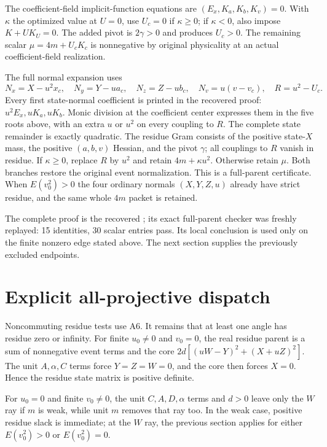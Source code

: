 The coefficient-field implicit-function equations are
$(E_x,K_a,K_b,K_v)=0$. With $\kappa$ the optimized value at $U=0$,
use $U_c=0$ if $\kappa\geq0$; if $\kappa<0$, also impose
$K+UK_U=0$. The added pivot is $2\gamma>0$ and produces $U_c>0$.
The remaining scalar $\mu=4m+U_cK_c$ is nonnegative by original
physicality at an actual coefficient-field realization.

The full normal expansion uses
\[
 N_x=X-u^2x_c,\quad N_y=Y-ua_c,\quad N_z=Z-ub_c,
 \quad N_v=u(v-v_c),\quad R=u^2-U_c.
\]
Every first state-normal coefficient is printed in the recovered proof:
$u^2E_x,uK_a,uK_b$. Monic division at the coefficient center expresses
them in the five roots above, with an extra $u$ or $u^2$ on every
coupling to $R$. The complete state remainder is exactly quadratic.
The residue Gram consists of the positive state-$X$ mass, the positive
$(a,b,v)$ Hessian, and the pivot $\gamma$; all couplings to $R$ vanish
in residue. If $\kappa\geq0$, replace $R$ by $u^2$ and retain
$4m+\kappa u^2$. Otherwise retain $\mu$. Both branches restore the
original event normalization. This is a full-parent certificate.
When $E(v_0^2)>0$ the four ordinary normals $(X,Y,Z,u)$ already
have strict residue, and the same whole $4m$ packet is retained.

The complete proof is the recovered
; its exact full-parent
checker was freshly replayed: 15 identities, 30 scalar entries pass.
Its local conclusion is used only on the finite nonzero edge stated
above. The next section supplies the previously excluded endpoints.

\section{Explicit all-projective dispatch}

Noncommuting residue tests use A6. It remains that at least one angle
has residue zero or infinity. For finite $u_0\ne0$ and $v_0=0$,
the real residue parent is a sum of nonnegative event terms and the
core $2d[(uW-Y)^2+(X+uZ)^2]$. The unit $A,\alpha,C$ terms
force $Y=Z=W=0$, and the core then forces $X=0$.
Hence the residue state matrix is positive definite.

For $u_0=0$ and finite $v_0\ne0$, the unit $C,A,D,\alpha$ terms
and $d>0$ leave only the $W$ ray if $m$ is weak, while unit $m$
removes that ray too. In the weak case, positive residue slack is
immediate; at the $W$ ray, the previous section applies for either
$E(v_0^2)>0$ or $E(v_0^2)=0$.

